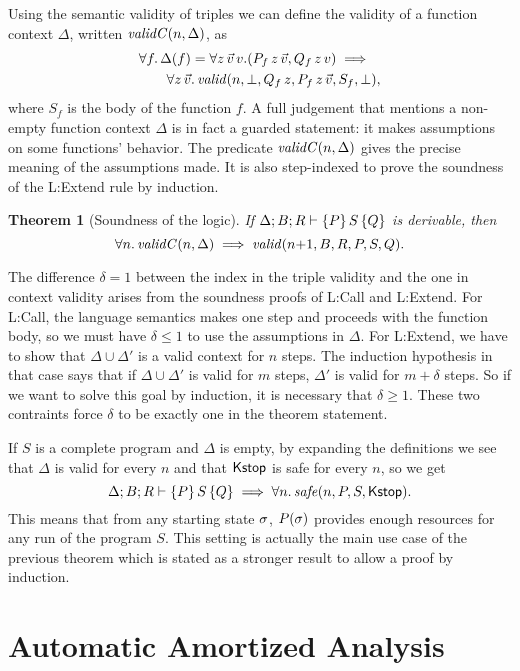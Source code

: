 \documentclass[nocopyrightspace,preprint]{sigplanconf}
\newtheorem{theorem}{Theorem}
\begin{document}
Using the semantic validity of triples we can define the validity
of a function context $\Delta$, written $\mathit{validC}(n,\Delta)$, as
\begin{align*}
  &\forall f .\, \Delta(f) =
    \forall z \, \vec v \, v .(P_f \, z \, \vec v, Q_f \, z \, v)
    \implies \\
  &\qquad \forall z \, \vec v .\,
  \mathit{valid}(n,\bot,Q_f \, z,P_f \, z \, \vec v,S_f,\bot) ,
\end{align*}
where $S_f$ is the body of the function $f$.  A full
judgement that mentions a non-empty function context
$\Delta$ is in fact a guarded statement: it makes
assumptions on some functions' behavior.  The predicate
$\mathit{validC}(n,\Delta)$ gives the precise meaning of the
assumptions made.  It is also step-indexed to prove the
soundness of the {\sc L:Extend} rule by induction.
%
\begin{theorem}[Soundness of the logic]
  If $\Delta; B; R \vdash \{P\}\, S\, \{Q\}$ is derivable, then
  $$
    \forall n .\, \mathit{validC}(n,\Delta)
      \implies \mathit{valid}(n {+} 1,B,R,P,S,Q).
  $$
\end{theorem}
%
\noindent
The difference $\delta = 1$ between the index in the triple
validity and the one in context validity arises from
the soundness proofs of {\sc L:Call} and {\sc L:Extend}.  For
{\sc L:Call}, the language semantics makes one step and
proceeds with the function body, so we must have
$\delta \le 1$ to use the assumptions in $\Delta$.
For {\sc L:Extend}, we have to show that $\Delta \cup \Delta'$
is a valid context for $n$ steps.  The induction hypothesis
in that case says that if $\Delta \cup \Delta'$ is valid
for $m$ steps, $\Delta'$ is valid for $m+\delta$ steps.
So if we want to solve this goal by induction, it is
necessary that $\delta \ge 1$.  These two contraints force
$\delta$ to be exactly one in the theorem statement.

If $S$ is a complete program and $\Delta$ is empty, by
expanding the definitions we see that $\Delta$ is valid
for every $n$ and that $\mathsf{Kstop}$ is safe for every $n$, so
we get
$$
\Delta; B; R \vdash \{P\}\, S\, \{Q\} \implies   \forall n .\, \mathit{safe}(n,P,S,\mathsf{Kstop}).
$$
This means that from any starting state $\sigma$, $P(\sigma)$
provides enough resources for any run of the program $S$.  This
setting is actually the main use case of the previous theorem
which is stated as a stronger result to allow a proof by
induction.



\section{Automatic Amortized Analysis}
\end{document}
